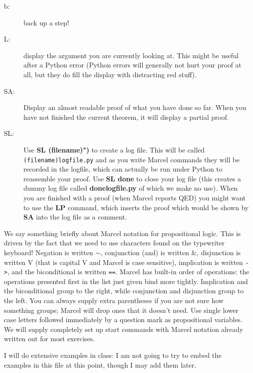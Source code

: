\documentclass[12pt]{article}
\begin{document}
\begin{description}

\item[b:]  back up a step!

\item[L:]  display the argument you are currently looking at.  This might be useful after a Python error (Python errors will generally not hurt your proof at all, but they do fill the display with distracting red stuff).

\item[SA:]  Display an almost readable proof of what you have done so far.  When you have not finished the current theorem, it will display
a partial proof.

\item[SL:]  Use {\bf SL (filename)")} to create a log file.  This will be called {\tt (filename)logfile.py} and as you write Marcel commands
they will be recorded in the logfile, which can actually be run under Python to reassemble your proof.  Use {\bf SL done} to close your log file (this creates a dummy log file called {\bf donelogfile.py} of which we make no use).  When you are finished with a proof (when Marcel reports QED)
you might want to use the {\bf LP} command, which inserts the proof which would be shown by {\bf SA} into the log file as a comment.

\end{description}

We say something briefly about Marcel notation for propositional logic.  This is driven by the fact that we need to use characters found on the typewriter keyboard!
Negation is written $\sim$,  conjunction (and) is written \&, disjunction is written V (that is capital V and Marcel is case sensitive), implication is written
{\tt ->}, and the biconditional is written {\tt ==}.  Marcel has built-in order of operations:  the operations presented first in the list just given bind more tightly.
Implication and the biconditional group to the right, while conjunction and disjunction group to the left.  You can always supply extra parentheses if you are not sure how something groups;  Marcel will drop ones that it doesn't need.  Use single lower case letters followed immediately by a question mark as propositional variables.  We will supply completely
set up start commands with Marcel notation already written out for most exercises.

I will do extensive examples in class:  I am not going to try to embed the examples in this file at this point, though I may add them later.
\end{document}
